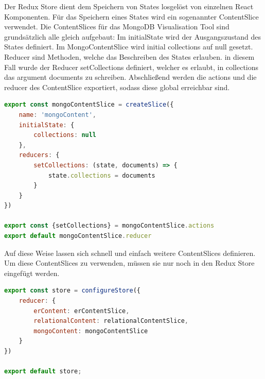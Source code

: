 Der Redux Store dient dem Speichern von States losgelöst von einzelnen React Komponenten.
Für das Speichern eines States wird ein sogenannter ContentSlice verwendet.
Die ContentSlices für das MongoDB Visualisation Tool sind grundsätzlich alle gleich aufgebaut:
Im initialState wird der Ausgangszustand des States definiert. 
Im MongoContentSlice wird initial collections auf null gesetzt.
Reducer sind Methoden, welche das Beschreiben des States erlauben.
in diesem Fall wurde der Reducer setCollections definiert, welcher es erlaubt, in collections das argument documents zu schreiben.
Abschließend werden die actions und die reducer des ContentSlice exportiert, sodass diese global erreichbar sind.

\begin{lstlisting}[language=JavaScript, caption={MongoContentSlice},label={lst:fe_redux_slice}]
export const mongoContentSlice = createSlice({
    name: 'mongoContent',
    initialState: {
        collections: null
    },
    reducers: {
        setCollections: (state, documents) => {
            state.collections = documents
        }
    }
})

export const {setCollections} = mongoContentSlice.actions
export default mongoContentSlice.reducer
\end{lstlisting}

Auf diese Weise lassen sich schnell und einfach weitere ContentSlices definieren.
Um diese ContentSlices zu verwenden, müssen sie nur noch in den Redux Store eingefügt werden.

\begin{lstlisting}[language=JavaScript, caption={Redux Store},label={lst:fe_redux_store}]
export const store = configureStore({
    reducer: {
        erContent: erContentSlice,
        relationalContent: relationalContentSlice,
        mongoContent: mongoContentSlice
    }
})

export default store;
\end{lstlisting}
